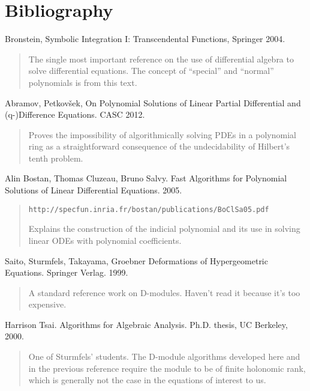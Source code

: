 \documentclass{article}
\begin{document}
\section*{Bibliography}

Bronstein, Symbolic Integration I: Transcendental Functions, Springer 2004.

\begin{quote}
The single most important reference on the use of differential
algebra to solve differential equations.  The concept of
``special'' and ``normal'' polynomials is from this text.
\end{quote}

Abramov, Petkov\v sek,
On Polynomial Solutions of Linear Partial
Differential and (q-)Difference Equations.  CASC 2012.

\begin{quote}
Proves the impossibility of algorithmically solving PDEs in a polynomial
ring as a straightforward consequence of the undecidability
of Hilbert's tenth problem.
\end{quote}

Alin Bostan, Thomas Cluzeau, Bruno Salvy.
Fast Algorithms for Polynomial Solutions
of Linear Differential Equations. 2005.

\begin{quote}
{\tt http://specfun.inria.fr/bostan/publications/BoClSa05.pdf}

Explains the construction of the indicial polynomial and its
use in solving linear ODEs with polynomial coefficients.
\end{quote}

Saito, Sturmfels, Takayama, Groebner Deformations of Hypergeometric Equations.
Springer Verlag. 1999.

\begin{quote}
A standard reference work on D-modules.  Haven't read it because it's
too expensive.
\end{quote}

Harrison Tsai.  Algorithms for Algebraic Analysis.  Ph.D. thesis, UC Berkeley, 2000.

\begin{quote}
One of Sturmfels' students.  The D-module algorithms developed here
and in the previous reference require the module to be of finite
holonomic rank, which is generally not the case in the equations
of interest to us.
\end{quote}
\end{document}
